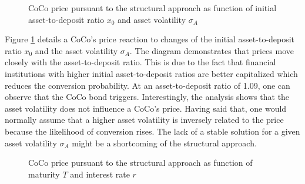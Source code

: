 \begin{figure}[H]
\centering
    \caption[CoCo price pursuant to the structural approach as function of asset-to-deposit ratio and asset volatility]{CoCo price pursuant to the structural approach as function of initial asset-to-deposit ratio $x_0$ and asset volatility $\sigma_A$}
  \label{fig:sa1}
  \end{figure}
  
Figure \ref{fig:sa1} details a CoCo's price reaction to changes of the initial asset-to-deposit ratio $x_0$ and the asset volatility $\sigma_A$. The diagram demonstrates that prices move closely with the asset-to-deposit ratio. This is due to the fact that financial institutions with higher initial asset-to-deposit ratios are better capitalized which reduces the conversion probability. At an asset-to-deposit ratio of 1.09, one can observe that the CoCo bond triggers. Interestingly, the analysis shows that the asset volatility does not influence a CoCo's price. Having said that, one would normally assume that a higher asset volatility is inversely related to the price because the likelihood of conversion rises. The lack of a stable solution for a given asset volatility $\sigma_A$ might be a shortcoming of the structural approach.

\begin{figure}[H]
\centering
    \caption[CoCo price pursuant to the structural approach as function of maturity and interest rate]{CoCo price pursuant to the structural approach as function of maturity $T$ and interest rate $r$}
  \label{fig:sa2}
  \end{figure}


